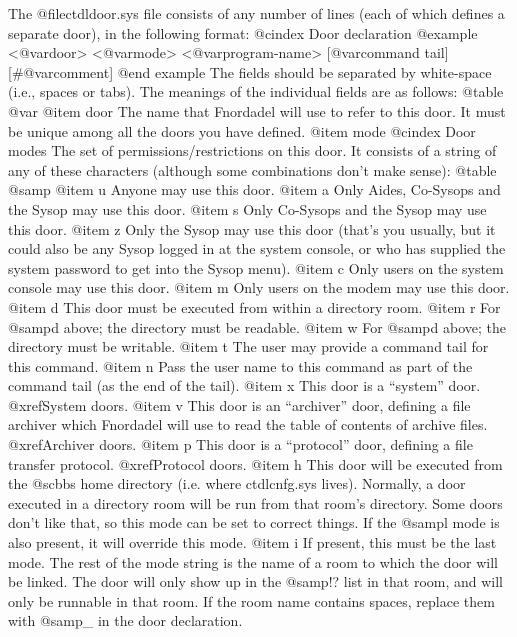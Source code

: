 The @file{ctdldoor.sys} file consists of any number of lines
(each of which defines a separate door), in the following format:
@cindex Door declaration
@example
<@var{door}> <@var{mode}> <@var{program-name}> [@var{command tail}] [#@var{comment}]
@end example
The fields should be separated by white-space (i.e., spaces or tabs).
The meanings of the individual fields are as follows:
@table @var
@item door
The name that Fnordadel will use to refer to this door.
It must be unique among all the doors you have defined.
@item mode
@cindex Door modes
The set of permissions/restrictions on this door.
It consists of a string of any of these characters (although
some combinations don't make sense):
@table @samp
@item u
Anyone may use this door.
@item a
Only Aides, Co-Sysops and the Sysop may use this door.
@item s
Only Co-Sysops and the Sysop may use this door.
@item z
Only the Sysop may use this door (that's you usually,
but it could also be any Sysop logged in
at the system console, or who has supplied the system
password to get into the Sysop menu).
@item c
Only users on the system console may use this door.
@item m
Only users on the modem may use this door.
@item d
This door must be executed from within a
directory room.
@item r
For @samp{d} above; the directory must be readable.
@item w
For @samp{d} above; the directory must be writable.
@item t
The user may provide a command tail for this
command.
@item n
Pass the user name to this command as part of
the command tail (as the end of the tail).
@item x
This door is a ``system'' door.  @xref{System doors}.
@item v
This door is an ``archiver'' door, defining a file archiver which Fnordadel
will use to read the table of contents of archive files.  @xref{Archiver doors}.
@item p
This door is a ``protocol'' door, defining a file transfer protocol.
@xref{Protocol doors}.
@item h
This door will be executed from the @sc{bbs} home directory (i.e. where
ctdlcnfg.sys lives).  Normally, a door executed in a directory room will
be run from that room's directory.  Some doors don't like that, so this
mode can be set to correct things.  If the @samp{l} mode is also present,
it will override this mode.
@item i
If present, this must be the last mode.  The rest of the mode string is
the name of a room to which the door will be linked.  The door will only
show up in the @samp{!?} list in that room, and will only be runnable in
that room.  If the room name contains spaces, replace them with @samp{_}
in the door declaration.

